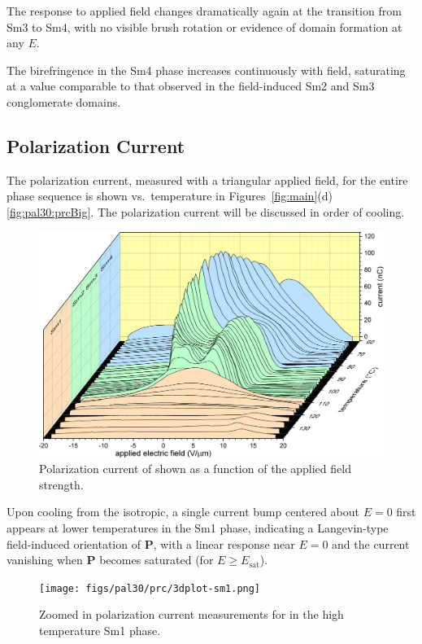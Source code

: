 \documentclass[aagreenthesis]{subfiles}
\begin{document}
The response to applied field changes dramatically again at
the transition from Sm3 to Sm4, with no visible brush rotation or evidence of domain formation at any $E$. 


The birefringence in the Sm4 phase increases continuously with field, saturating at a value comparable to that observed in the field-induced Sm2 and Sm3 conglomerate domains.

\subsection{Polarization Current}

The polarization current, measured with a triangular
applied field, for the entire phase sequence is shown vs.\ temperature in Figures~\ref{fig:main}(d)
\autoref{fig:pal30:prcBig}. The polarization current will be discussed in order
of cooling.

\begin{figure}[h!]
    \centering
\includegraphics[width=\textwidth]{figs/pal30/fromPaper/finalFigs/polzv9.png}
\caption{\label{fig:pal30:prcBig} Polarization current of \nfour{} shown as a
function of the applied field strength.}
\end{figure}



Upon cooling from the isotropic, a single current bump centered
about $E=0$ first appears at lower temperatures in the Sm1 phase, indicating a Langevin-type
field-induced orientation of $\mathbf{P}$, with a linear response near $E=0$
and the current vanishing  when $\mathbf{P}$ becomes saturated (for $E \ge E_\text{sat}$).

\begin{figure}[h!]
    \centering
    \texttt{[image: figs/pal30/prc/3dplot-sm1.png]}
    \caption{\label{fig:pal30:sm1:prc1} Zoomed in polarization current measurements for \nfour{} in the high temperature
    Sm1 phase.}
    \end{figure}
 
\end{document}
